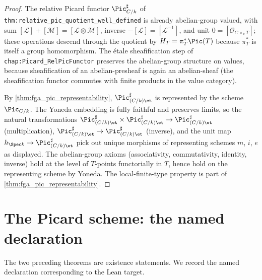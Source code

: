 \begin{proof}
  
  The relative Picard functor \(\Pic^\sharp_{C/k}\) of
  \texttt{thm:relative\_pic\_quotient\_well\_defined} is already abelian-group
  valued, with sum \([\mathcal{L}] + [\mathcal{M}] = [\mathcal{L} \otimes
  \mathcal{M}]\), inverse \(-[\mathcal{L}] = [\mathcal{L}^{-1}]\), and unit
  \(0 = [\mathcal{O}_{C \times_k T}]\); these operations descend through
  the quotient by \(H_T = \pi_T^*\Pic(T)\) because \(\pi_T^*\) is itself a
  group homomorphism. The \'etale sheafification step of
  \texttt{chap:Picard\_RelPicFunctor} preserves the abelian-group structure
  on values, because sheafification of an abelian-presheaf is again an
  abelian-sheaf (the sheafification functor commutes with finite products
  in the value category).

  By \cref{thm:fga_pic_representability}, \(\Pic^\sharp_{(C/k)\et}\) is
  represented by the scheme \(\Pic_{C/k}\). The Yoneda embedding is fully
  faithful and preserves limits, so the natural transformations
  $\Pic^\sharp_{(C/k)\et} \times \Pic^\sharp_{(C/k)\et} \to
  \Pic^\sharp_{(C/k)\et}$ (multiplication),
  \(\Pic^\sharp_{(C/k)\et} \to \Pic^\sharp_{(C/k)\et}\) (inverse), and the
  unit map \(h_{\Spec k} \to \Pic^\sharp_{(C/k)\et}\) pick out unique
  morphisms of representing schemes \(m\), \(i\), \(e\) as displayed. The
  abelian-group axioms (associativity, commutativity, identity,
  inverse) hold at the level of \(T\)-points functorially in \(T\), hence
  hold on the representing scheme by Yoneda. The local-finite-type
  property is part of \cref{thm:fga_pic_representability}.
\end{proof}

\section{The Picard scheme: the named declaration}
\label{sec:fga_pic_named_definition}

The two preceding theorems are existence statements. We record the
named declaration corresponding to the Lean target.

